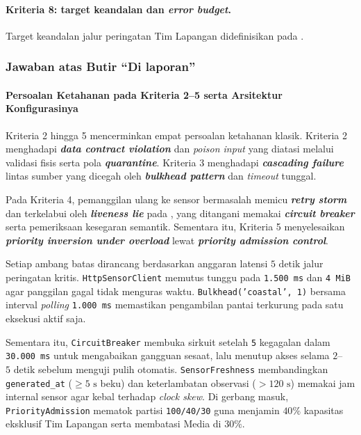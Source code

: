 \paragraph*{Kriteria 8: target keandalan dan \textit{error budget}.}
Target keandalan jalur peringatan Tim Lapangan didefinisikan pada . 

\subsubsection{Jawaban atas Butir ``Di laporan''}

\paragraph*{Persoalan Ketahanan pada Kriteria 2--5 serta Arsitektur Konfigurasinya}
Kriteria 2 hingga 5 mencerminkan empat persoalan ketahanan klasik. Kriteria 2 menghadapi \textbf{\textit{data contract violation}} dan \textit{poison input} yang diatasi melalui validasi fisis serta pola \textbf{\textit{quarantine}}. Kriteria 3 menghadapi \textbf{\textit{cascading failure}} lintas sumber yang dicegah oleh \textbf{\textit{bulkhead pattern}} dan \textit{timeout} tunggal.

Pada Kriteria 4, pemanggilan ulang ke sensor bermasalah memicu \textbf{\textit{retry storm}} dan terkelabui oleh \textbf{\textit{liveness lie}} pada , yang ditangani memakai \textbf{\textit{circuit breaker}} serta pemeriksaan kesegaran semantik. Sementara itu, Kriteria 5 menyelesaikan \textbf{\textit{priority inversion under overload}} lewat \textbf{\textit{priority admission control}}.

Setiap ambang batas dirancang berdasarkan anggaran latensi $5\text{ detik}$ jalur peringatan kritis. \texttt{HttpSensorClient} memutus tunggu pada \texttt{1.500 ms} dan \texttt{4 MiB} agar panggilan gagal tidak menguras waktu. \texttt{Bulkhead('coastal', 1)} bersama interval \textit{polling} \texttt{1.000 ms} memastikan pengambilan pantai terkurung pada satu eksekusi aktif saja.

Sementara itu, \texttt{CircuitBreaker} membuka sirkuit setelah \texttt{5} kegagalan dalam \texttt{30.000 ms} untuk mengabaikan gangguan sesaat, lalu menutup akses selama $2$--$5\text{ detik}$ sebelum menguji pulih otomatis. \texttt{SensorFreshness} membandingkan \texttt{generated\_at} ($\ge 5\text{ s}$ beku) dan keterlambatan observasi ($> 120\text{ s}$) memakai jam internal sensor agar kebal terhadap \textit{clock skew}. Di gerbang masuk, \texttt{PriorityAdmission} mematok partisi \texttt{100/40/30} guna menjamin $40\%$ kapasitas eksklusif Tim Lapangan serta membatasi Media di $30\%$.

